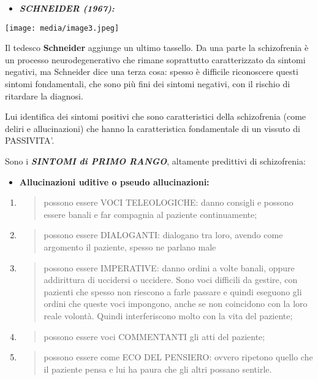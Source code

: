 \documentclass[]{article}
\begin{document}
\begin{itemize}
\item
  \textbf{\emph{SCHNEIDER (1967):}}
\end{itemize}

\texttt{[image: media/image3.jpeg]}

Il tedesco \textbf{Schneider} aggiunge un ultimo tassello. Da una parte
la schizofrenia è un processo neurodegenerativo che rimane soprattutto
caratterizzato da sintomi negativi, ma Schneider dice una terza cosa:
spesso è difficile riconoscere questi sintomi fondamentali, che sono più
fini dei sintomi negativi, con il rischio di ritardare la diagnosi.

Lui identifica dei sintomi positivi che sono caratteristici della
schizofrenia (come deliri e allucinazioni) che hanno la caratteristica
fondamentale di un vissuto di PASSIVITA'.

Sono i \textbf{\emph{SINTOMI di PRIMO RANGO}}, altamente predittivi di
schizofrenia:

\begin{itemize}
\item
  \textbf{Allucinazioni uditive o pseudo allucinazioni: }
\end{itemize}

\begin{enumerate}
\def\labelenumi{\arabic{enumi}.}
\item
  \begin{quote}
  possono essere VOCI TELEOLOGICHE: danno consigli e possono essere
  banali e far compagnia al paziente continuamente;
  \end{quote}
\item
  \begin{quote}
  possono essere DIALOGANTI: dialogano tra loro, avendo come argomento
  il paziente, spesso ne parlano male
  \end{quote}
\item
  \begin{quote}
  possono essere IMPERATIVE: danno ordini a volte banali, oppure
  addirittura di uccidersi o uccidere. Sono voci difficili da gestire,
  con pazienti che spesso non riescono a farle passare e quindi eseguono
  gli ordini che queste voci impongono, anche se non coincidono con la
  loro reale volontà. Quindi interferiscono molto con la vita del
  paziente;
  \end{quote}
\item
  \begin{quote}
  possono essere voci COMMENTANTI gli atti del paziente;
  \end{quote}
\item
  \begin{quote}
  possono essere come ECO DEL PENSIERO: ovvero ripetono quello che il
  paziente pensa e lui ha paura che gli altri possano sentirle.
  \end{quote}
\end{enumerate}
\end{document}
